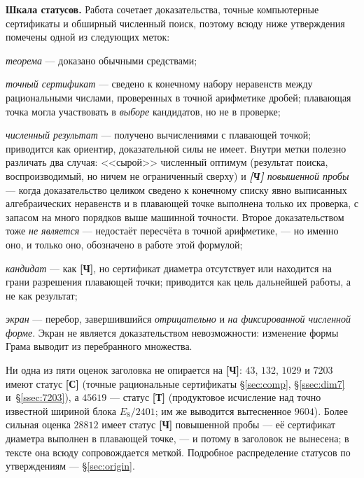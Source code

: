 \medskip\noindent
\textbf{Шкала статусов.} Работа сочетает доказательства, точные компьютерные
сертификаты и обширный численный поиск, поэтому всюду ниже утверждения
помечены одной из следующих меток:

\begin{description}[leftmargin=2.4em,itemsep=1pt,topsep=3pt]
\item[\textbf{[Т]}] \emph{теорема} --- доказано обычными средствами;
\item[\textbf{[С]}] \emph{точный сертификат} --- сведено к конечному набору
неравенств между рациональными числами, проверенных в точной арифметике дробей;
плавающая точка могла участвовать в \emph{выборе} кандидатов, но не в проверке;
\item[\textbf{[Ч]}] \emph{численный результат} --- получено вычислениями с
плавающей точкой; приводится как ориентир, доказательной силы не имеет.
Внутри метки полезно различать два случая: <<сырой>> численный оптимум
(результат поиска, воспроизводимый, но ничем не ограниченный сверху) и
\emph{\textbf{[Ч]} повышенной пробы} --- когда доказательство целиком сведено
к конечному списку явно выписанных алгебраических неравенств и в плавающей
точке выполнена только их проверка, с запасом на много порядков выше машинной
точности. Второе доказательством тоже \emph{не является} --- недостаёт
пересчёта в точной арифметике, --- но именно оно, и только оно, обозначено в
работе этой формулой;
\item[\textbf{[Ч]}${}^{*}$] \emph{кандидат} --- как \textbf{[Ч]}, но
сертификат диаметра отсутствует или находится на грани разрешения плавающей
точки; приводится как цель дальнейшей работы, а не как результат;
\item[\textbf{[Э]}] \emph{экран} --- перебор, завершившийся \emph{отрицательно}
и \emph{на фиксированной численной форме}. Экран не является доказательством
невозможности: изменение формы Грама выводит из перебранного множества.
\end{description}

\noindent Ни одна из пяти оценок заголовка не опирается на \textbf{[Ч]}:
$43$, $132$, $1029$ и $7203$ имеют статус \textbf{[С]} (точные рациональные
сертификаты \S\ref{sec:comp}, \S\ref{ssec:dim7} и~\S\ref{ssec:7203}), а
$45619$ --- статус \textbf{[Т]} (продуктовое исчисление над точно известной
шириной блока $E_8/2401$; им же выводится вытесненное $9604$). Более сильная
оценка $28812$ имеет статус \textbf{[Ч]}
повышенной пробы --- её сертификат диаметра выполнен в плавающей точке, --- и
потому в заголовок не вынесена; в тексте она всюду сопровождается меткой.
Подробное распределение статусов по утверждениям --- \S\ref{sec:origin}.
